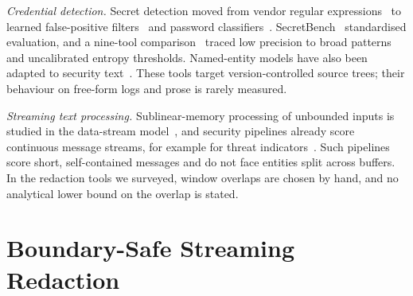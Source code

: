 \documentclass[conference]{IEEEtran}
\begin{document}
\textit{Credential detection.} Secret detection moved from vendor regular
expressions~\cite{sinha2015secretkey} to learned false-positive
filters~\cite{saha2020secrets} and password classifiers~\cite{feng2022passfinder}.
SecretBench~\cite{basak2023secretbench} standardised evaluation, and a
nine-tool comparison~\cite{basak2023comparative} traced low precision to broad
patterns and uncalibrated entropy thresholds. Named-entity models have also
been adapted to security text~\cite{simran2020cyberner}. These tools target
version-controlled source trees; their behaviour on free-form logs and prose
is rarely measured.

\textit{Streaming text processing.} Sublinear-memory processing of unbounded
inputs is studied in the data-stream model~\cite{muthukrishnan2005streams},
and security pipelines already score continuous message streams, for example
for threat indicators~\cite{simran2020twitter}. Such pipelines score short,
self-contained messages and do not face entities split across buffers. In the
redaction tools we surveyed, window overlaps are chosen by hand, and no
analytical lower bound on the overlap is stated.

\section{Boundary-Safe Streaming Redaction}
\label{sec:system}
\end{document}
